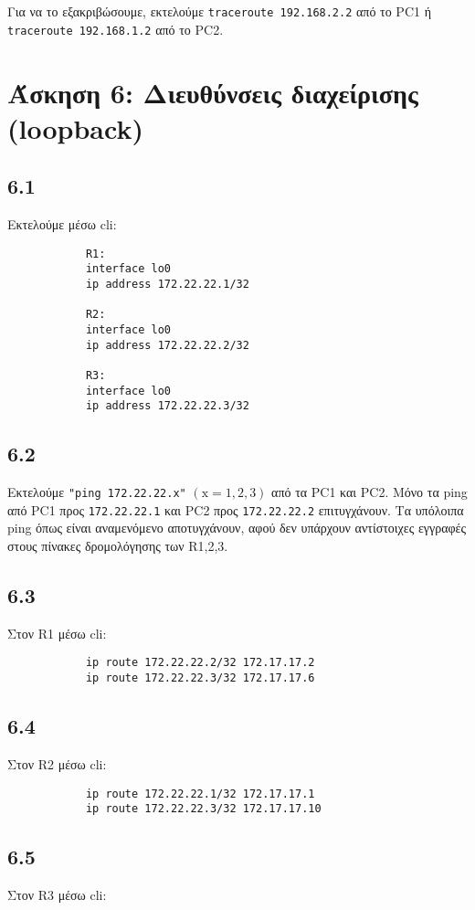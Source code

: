 \documentclass[a4paper, 12pt]{article}
\begin{document}
		Για να το εξακριβώσουμε, εκτελούμε \verb|traceroute 192.168.2.2| από το PC1 ή \verb|traceroute 192.168.1.2| από το PC2. 

\section*{Άσκηση 6: Διευθύνσεις διαχείρισης (loopback)}

	\subsection*{6.1}
		Εκτελούμε μέσω cli: 
		
		\begin{verbatim}
			R1:
			interface lo0
			ip address 172.22.22.1/32			
			
			R2:
			interface lo0
			ip address 172.22.22.2/32			
			
			R3:
			interface lo0
			ip address 172.22.22.3/32
		\end{verbatim}

	\subsection*{6.2} 
		Εκτελούμε \verb|"ping 172.22.22.x"| $(\text{x} = 1,2,3)$ από τα PC1 και PC2. 
		Μόνο τα ping από PC1 προς \verb|172.22.22.1| και PC2 προς \verb|172.22.22.2| επιτυγχάνουν. Τα υπόλοιπα ping όπως είναι αναμενόμενο αποτυγχάνουν, αφού δεν υπάρχουν αντίστοιχες εγγραφές στους πίνακες δρομολόγησης των R1,2,3.
		
	\subsection*{6.3}
		Στον R1 μέσω cli:
		
		\begin{verbatim}
			ip route 172.22.22.2/32 172.17.17.2 
			ip route 172.22.22.3/32 172.17.17.6
		\end{verbatim}

	\subsection*{6.4}
		Στον R2 μέσω cli:
		
		\begin{verbatim}
			ip route 172.22.22.1/32 172.17.17.1 
			ip route 172.22.22.3/32 172.17.17.10
		\end{verbatim}


	\subsection*{6.5}
		Στον R3 μέσω cli:
		
\end{document}
